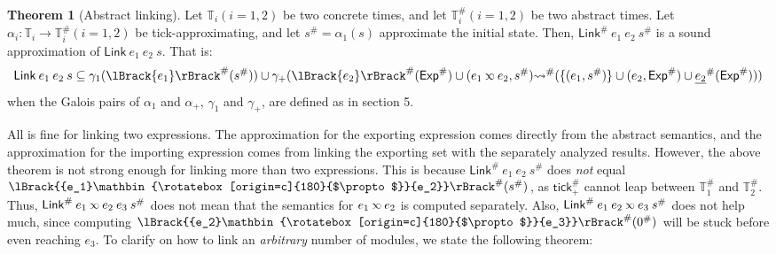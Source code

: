 \documentclass[acmsmall,review]{acmart}\settopmatter{printfolios=true,printccs=false,printacmref=false}
\theoremstyle{definition}
\newtheorem{thm}{Theorem}[section]
\newcommand*{\A}[1]{{#1}^{\#}}
\newcommand*{\Time}{\mathbb{T}}
\newcommand*{\ATime}{\A{\Time}}
\newcommand*{\semlink}{\mathbin{\rotatebox[origin=c]{180}{$\propto$}}}
\newcommand*{\link}[2]{{#1}\semlink{#2}}
\newcommand*{\Exp}{\mathsf{Exp}}
\newcommand*{\Link}{\mathsf{Link}}
\newcommand*{\sembracket}[1]{\lBrack{#1}\rBrack}
\newcommand*{\tick}{\mathsf{tick}}
\begin{document}
\begin{thm}[Abstract linking]
  Let $\Time_i(i=1,2)$ be two concrete times, and let $\ATime_i(i=1,2)$ be two abstract times.
  Let $\alpha_i:\Time_i\rightarrow\ATime_i(i=1,2)$ be tick-approximating, and let $\A{s}=\alpha_1(s)$ approximate the initial state.
  Then, $\A\Link\:e_1\:e_2\:\A{s}$ is a sound approximation of $\Link\:e_1\:e_2\:s$.
  That is:
  \[\Link\:e_1\:e_2\:s\subseteq\gamma_1(\A{\sembracket{e_1}}(\A{s}))\cup\gamma_+(\A{\sembracket{e_2}}(\A\Exp)\cup(\link{e_1}{e_2},\A{s})\A\rightsquigarrow(\{(e_1,\A{s})\}\cup(e_2,\A\Exp)\cup\A{\underline{e_2}}(\A\Exp)))\]
  when the Galois pairs of $\alpha_1$ and $\alpha_+$, $\gamma_1$ and $\gamma_+$, are defined as in section 5.
\end{thm}

All is fine for linking two expressions.
The approximation for the exporting expression comes directly from the abstract semantics, and the approximation for the importing expression comes from linking the exporting set with the separately analyzed results.
However, the above theorem is not strong enough for linking more than two expressions.
This is because $\A\Link\:e_1\:e_2\:\A{s}$ does \emph{not} equal $\A{\sembracket{\link{e_1}{e_2}}}(\A{s})$, as $\A\tick_+$ cannot leap between $\ATime_1$ and $\ATime_2$.
Thus, $\A\Link\:\link{e_1}{e_2}\:e_3\:\A{s}$ does not mean that the semantics for $\link{e_1}{e_2}$ is computed separately.
Also, $\A\Link\:e_1\:\link{e_2}{e_3}\:\A{s}$ does not help much, since computing $\A{\sembracket{\link{e_2}{e_3}}}(\A{0})$ will be stuck before even reaching $e_3$.
To clarify on how to link an \emph{arbitrary} number of modules, we state the following theorem:
\end{document}
